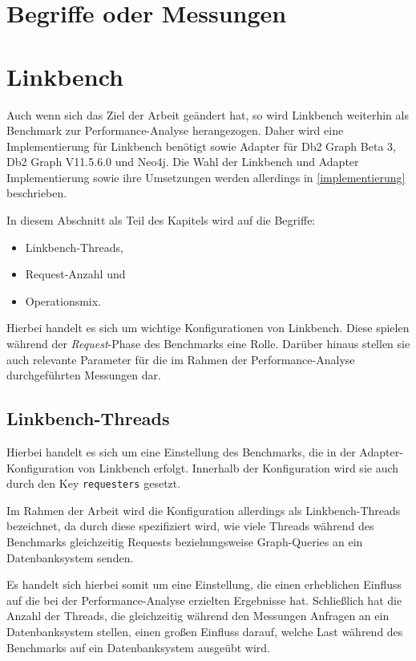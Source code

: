 \section{Begriffe oder Messungen}

\section{Linkbench}
Auch wenn sich das Ziel der Arbeit geändert hat, so wird Linkbench weiterhin als Benchmark zur Performance-Analyse herangezogen. Daher wird eine Implementierung für Linkbench benötigt sowie Adapter für Db2 Graph Beta 3, Db2 Graph V11.5.6.0 und Neo4j. Die Wahl der Linkbench und Adapter Implementierung sowie ihre Umsetzungen werden allerdings in \autoref{implementierung} beschrieben. 

In diesem Abschnitt als Teil des Kapitels wird auf die Begriffe: 
\begin{itemize}
    \item Linkbench-Threads,
    \item Request-Anzahl und
    \item Operationsmix.
\end{itemize}
Hierbei handelt es sich um wichtige Konfigurationen von Linkbench. Diese spielen während der \textit{Request}-Phase des Benchmarks eine Rolle. Darüber hinaus stellen sie auch relevante Parameter für die im Rahmen der Performance-Analyse durchgeführten Messungen dar. 

\subsection{Linkbench-Threads}
\label{analyse:linkbench:threads}
Hierbei handelt es sich um eine Einstellung des Benchmarks, die in der Adapter-Konfiguration von Linkbench erfolgt. Innerhalb der Konfiguration wird sie auch durch den Key \texttt{requesters} gesetzt. 

Im Rahmen der Arbeit wird die Konfiguration allerdings als Linkbench-Threads bezeichnet, da durch diese spezifiziert wird, wie viele Threads während des Benchmarks gleichzeitig Requests beziehungsweise Graph-Queries an ein Datenbanksystem senden.

Es handelt sich hierbei somit um eine Einstellung, die einen erheblichen Einfluss auf die bei der Performance-Analyse erzielten Ergebnisse hat. Schließlich hat die Anzahl der Threads, die gleichzeitig während den Messungen Anfragen an ein Datenbanksystem stellen, einen großen Einfluss darauf, welche Last während des Benchmarks auf ein Datenbanksystem ausgeübt wird. 


